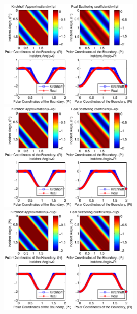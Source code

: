 \documentclass[12pt]{iopart}
\begin{document}
\begin{figure}
	\centering
	\includegraphics[width=0.6\textwidth]{./figure_sc/scattering_coefficient_circle_1.eps}
	\includegraphics[width=0.6\textwidth]{./figure_sc/scattering_coefficient_circle_4.eps}
	\includegraphics[width=0.6\textwidth]{./figure_sc/scattering_coefficient_circle_16.eps}
	\caption{}\label{circle}
\end{figure}
\end{document}
